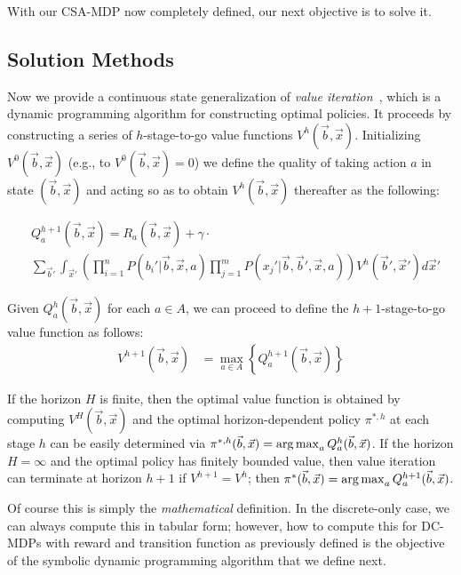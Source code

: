 \documentclass[letterpaper]{article}
\def\argmax{\operatornamewithlimits{arg\,max}}
\begin{document}
With our CSA-MDP now completely defined, our next objective
is to solve it.

\subsection{Solution Methods}

\label{sec:soln}

Now we provide a continuous state generalization of {\it
value iteration}~\cite{bellman}, which is a dynamic programming
algorithm for constructing optimal policies.  It proceeds by
constructing a series of $h$-stage-to-go value functions
$V^h(\vec{b},\vec{x})$.  Initializing $V^0(\vec{b},\vec{x})$ 
(e.g., to $V^0(\vec{b},\vec{x}) = 0$) 
we define the quality of taking action $a$ in state
$(\vec{b},\vec{x})$ and acting so as to obtain $V^{h}(\vec{b},\vec{x})$ 
thereafter as the following:
\vspace{-3mm}

{\footnotesize
\begin{align}
& Q_a^{h+1}(\vec{b},\vec{x}) = R_a(\vec{b},\vec{x}) + \gamma \cdot \label{eq:qfun} \\ 
& \sum_{\vec{b}'} \int_{\vec{x}'} \left( \prod_{i=1}^n P(b_i'|\vec{b},\vec{x},a) \prod_{j=1}^m P(x_j'|\vec{b},\vec{b}',\vec{x},a) \right) V^h(\vec{b}',\vec{x}') d\vec{x}' \nonumber
\end{align}}

Given $Q_a^h(\vec{b},\vec{x})$ for each $a \in A$, we can proceed
to define the $h+1$-stage-to-go value function as follows:
\begin{align}
V^{h+1}(\vec{b},\vec{x}) & = \max_{a \in A} \left\{ Q^{h+1}_a(\vec{b},\vec{x}) \right\} \label{eq:vfun}
\end{align}

If the horizon $H$ is finite, then the optimal value function is
obtained by computing $V^H(\vec{b},\vec{x})$ and the optimal
horizon-dependent policy $\pi^{*,h}$ at each stage $h$ can be easily
determined via 
$\pi^{*,h}(\vec{b},\vec{x}) = \argmax_a Q^h_a(\vec{b},\vec{x})$.  
If the horizon 
$H = \infty$ and the optimal policy has finitely bounded value, 
then value iteration can terminate at horizon $h+1$ if 
$V^{h+1} = V^{h}$; then 
$\pi^*(\vec{b},\vec{x}) = \argmax_a Q^{h+1}_a(\vec{b},\vec{x})$.

Of course this is simply the \emph{mathematical} definition.  In the
discrete-only case, we can always compute this in tabular form;
however, how to compute this for DC-MDPs with reward and transition
function as previously defined is the objective of the symbolic
dynamic programming algorithm that we define next.
\end{document}
